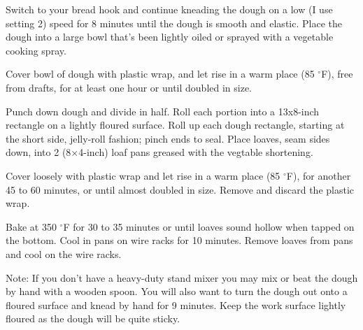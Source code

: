 \documentclass{article}
\begin{document}
\begin{multicols}{2}
      Switch to your bread hook and continue kneading the dough on a low (I use setting 2)
      speed for 8 minutes until the dough is smooth and elastic. Place the dough into a
      large bowl that's been lightly oiled or sprayed with a vegetable cooking spray.
      \medskip

      Cover bowl of dough with plastic wrap, and let rise in a warm place (85 $^{\circ}$F), free from
      drafts, for at least one hour or until doubled in size.
      \medskip

      Punch down dough and divide in half. Roll each portion into a 13x8-inch rectangle on a
      lightly floured surface. Roll up each dough rectangle, starting at the short side,
      jelly-roll fashion; pinch ends to seal. Place loaves, seam sides down, into 2
      (8$\times$4-inch) loaf pans greased with the vegtable shortening.
      \medskip

      Cover loosely with plastic wrap and let rise in a warm place (85 $^{\circ}$F), for another
      45 to 60 minutes, or until almost doubled in size. Remove and discard the plastic wrap.
      \medskip

      Bake at 350 $^{\circ}$F for 30 to 35 minutes or until loaves sound hollow when tapped on the bottom.
      Cool in pans on wire racks for 10 minutes. Remove loaves from pans and cool on the wire racks.
      \medskip

\end{multicols}

Note: If you don't have a heavy-duty stand mixer you may mix or beat the dough by
hand with a wooden spoon. You will also want to turn the dough out onto a floured
surface and knead by hand for 9 minutes. Keep the work surface lightly floured as
the dough will be quite sticky.
\medskip

\end{document}
